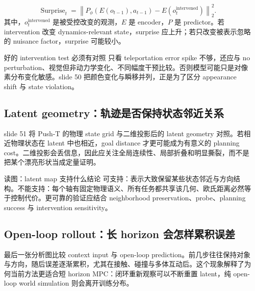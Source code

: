 \[
\operatorname{Surprise}_t
=\left\|P_\phi(E(o_{t-1}),a_{t-1})-E(o_t^{\text{intervened}})\right\|_2^2.
\]
其中，$o_t^{\text{intervened}}$ 是被受控改变的观测，$E$ 是 encoder，$P$ 是 predictor。若 intervention 改变 dynamics-relevant state，surprise 应上升；若只改变被表示忽略的 nuisance factor，surprise 可能较小。


\begin{importantbox}{好的 intervention test 必须有对照}
只看 teleportation error spike 不够，还应与 no perturbation、视觉但非动力学变化、不同幅度干预比较。否则模型可能只是对像素分布变化敏感。slide 50 把颜色变化与瞬移并列，正是为了区分 appearance shift 与 state violation。
\end{importantbox}

\subsection{Latent geometry：轨迹是否保持状态邻近关系}

slide 51 将 Push-T 的物理 state grid 与二维投影后的 latent geometry 对照。若相近物理状态在 latent 中也相近，goal distance 才更可能成为有意义的 planning cost。二维投影会丢信息，因此应关注全局连续性、局部折叠和明显撕裂，而不是把某个漂亮形状当成定量证明。


\begin{knowledgebox}{读图：latent map 支持什么结论}
可支持：表示大致保留某些状态邻近与方向结构。不能支持：每个轴有固定物理语义、所有任务都共享该几何、欧氏距离必然等于控制代价。更可靠的验证应结合 neighborhood preservation、probe、planning success 与 intervention sensitivity。
\end{knowledgebox}

\subsection{Open-loop rollout：长 horizon 会怎样累积误差}

最后一张分析图比较 context input 与 open-loop prediction。前几步往往保持对象与方向，随后误差逐渐累积，尤其在接触、碰撞与多体互动后。这个现象解释了为何当前方法更适合短 horizon MPC：闭环重新观察可以不断重置 latent，纯 open-loop world simulation 则会离开训练分布。

